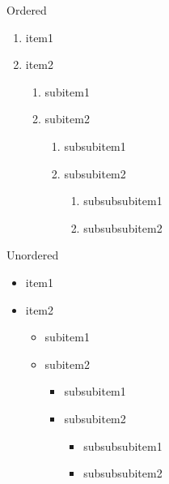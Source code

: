 \documentclass{article}
\begin{document}
	Ordered
	\begin{enumerate}
		\item item1
		\item item2
		\begin{enumerate}
			\item subitem1
			\item subitem2
			\begin{enumerate}
				\item subsubitem1
				\item subsubitem2
				\begin{enumerate}
					\item subsubsubitem1
					\item subsubsubitem2
				\end{enumerate}
			\end{enumerate}
		\end{enumerate}
	\end{enumerate}
	
	Unordered
	\begin{itemize}
		\item item1
		\item item2
		\begin{itemize}
			\item subitem1
			\item subitem2
			\begin{itemize}
				\item subsubitem1
				\item subsubitem2
				\begin{itemize}
					\item subsubsubitem1
					\item subsubsubitem2
				\end{itemize}
			\end{itemize}
		\end{itemize}
	\end{itemize}
\end{document}
